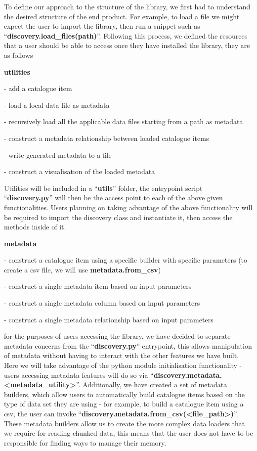 To define our approach to the structure of the library, we first had to understand the desired structure of the end
product.
For example, to load a file we might expect the user to import the library, then run a snippet such as
``\textbf{discovery.load\_files(path)}''.
Following this process, we defined the resources that a user should be able to access once they have installed the
library, they are as follows\:

\bigbreak
\textbf{utilities}

- add a catalogue item

- load a local data file as metadata

- recursively load all the applicable data files starting from a path as metadata

- construct a metadata relationship between loaded catalogue items

- write generated metadata to a file

- construct a visualisation of the loaded metadata

Utilities will be included in a ``\textbf{utils}'' folder, the entrypoint script ``\textbf{discovery.py}'' will then be
the access point to each of the above given functionalities.
Users planning on taking advantage of the above functionality will be required to import the discovery class and
instantiate it, then access the methods inside of it.

\bigbreak
\textbf{metadata}

- construct a catalogue item using a specific builder with specific parameters (to create a csv file, we will use
\textbf{metadata.from\_csv})

- construct a single metadata item based on input parameters

- construct a single metadata column based on input parameters

- construct a single metadata relationship based on input parameters

for the purposes of users accessing the library, we have decided to separate metadata concerns from the
``\textbf{discovery.py}'' entrypoint, this allows manipulation of metadata without having to interact with the other
features we have built.
Here we will take advantage of the python module initialisation functionality - users accessing metadata features
will do so via ``\textbf{discovery.metadata.<metadata\_utility>}''.
Additionally, we have created a set of metadata builders, which allow users to automatically build catalogue items
based on the type of data set they are using - for example, to build a catalogue item using a csv, the user can invoke
``\textbf{discovery.metadata.from\_csv(<file\_path>)}''.
These metadata builders allow us to create the more complex data loaders that we require for reading chunked data, this
means that the user does not have to be responsible for finding ways to manage their memory.

